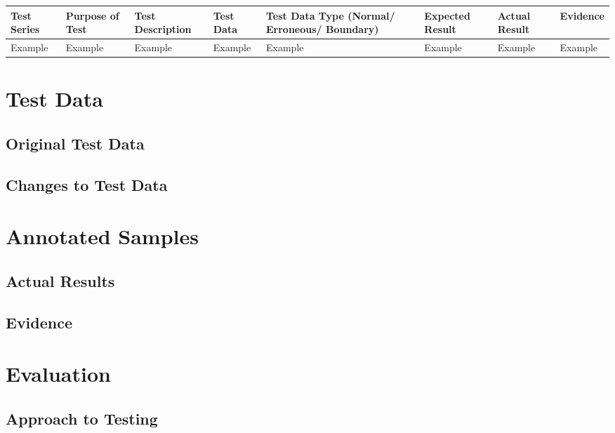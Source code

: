 \begin{landscape}
\begin{center}
    \begin{longtable}{|p{1.5cm}|p{2.5cm}|p{2.5cm}|p{2cm}|p{2cm}|p{2cm}|p{2cm}|p{2cm}|}
        \hline
        \textbf{Test Series} & \textbf{Purpose of Test} & \textbf{Test Description} & \textbf{Test Data} & \textbf{Test Data Type (Normal/ Erroneous/ Boundary)} & \textbf{Expected Result} & \textbf{Actual Result} & \textbf{Evidence}\\ \hline
        Example & Example & Example & Example & Example & Example & Example & Example \\ \hline
    \end{longtable}
\end{center}

\section{Test Data}

\subsection{Original Test Data}

\subsection{Changes to Test Data}

\section{Annotated Samples}

\subsection{Actual Results}

\subsection{Evidence}

\end{landscape}

\section{Evaluation}

\subsection{Approach to Testing}

